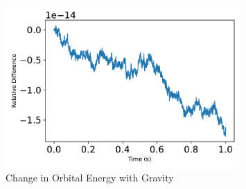 \begin{figure}[htbp]\centerline{\includegraphics[width=0.8\textwidth]{AutoTeX/ChangeInOrbitalEnergy2}}\caption{Change in Orbital Energy with Gravity}\label{fig:ChangeInOrbitalEnergy2}\end{figure}